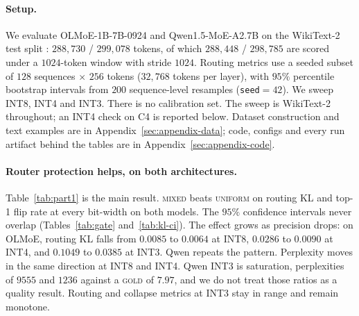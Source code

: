\documentclass[11pt]{article}
\newcommand{\gold}{\textsc{gold}}
\newcommand{\uniform}{\textsc{uniform}}
\newcommand{\mixed}{\textsc{mixed}}
\begin{document}
\paragraph{Setup.}
We evaluate OLMoE-1B-7B-0924
\citep{muennighoff2024olmoe} and Qwen1.5-MoE-A2.7B
\citep{qwen2024moe,qwen2023technical} on the WikiText-2 test split
\citep{merity2017pointer}: $288{,}730$ / $299{,}078$ tokens, of which
$288{,}448$ / $298{,}785$ are scored under a $1024$-token window with
stride $1024$. Routing metrics use a seeded subset of $128$ sequences
$\times$ $256$ tokens ($32{,}768$ tokens per layer), with $95\%$
percentile bootstrap intervals from $200$ sequence-level resamples
(\texttt{seed}${=}42$). We sweep INT8, INT4 and INT3. There is no
calibration set. The sweep is WikiText-2 throughout; an INT4 check on C4
is reported below. Dataset construction and text examples are in
Appendix~\ref{sec:appendix-data}; code, configs and every run artifact
behind the tables are in Appendix~\ref{sec:appendix-code}.

\paragraph{Router protection helps, on both architectures.}
Table~\ref{tab:part1} is the main result. \mixed{} beats \uniform{} on
routing KL and top-1 flip rate at every bit-width on both models. The
$95\%$ confidence intervals never overlap
(Tables~\ref{tab:gate} and~\ref{tab:kl-ci}). The effect grows as
precision drops: on OLMoE, routing KL falls from $0.0085$ to $0.0064$ at
INT8, $0.0286$ to $0.0090$ at INT4, and $0.1049$ to $0.0385$ at INT3. Qwen
repeats the pattern. Perplexity moves in the same direction at INT8 and
INT4. Qwen INT3 is saturation, perplexities of $9555$ and $1236$ against a
\gold{} of $7.97$, and we do not treat those ratios as a quality result.
Routing and collapse metrics at INT3 stay in range and remain monotone.
\end{document}
